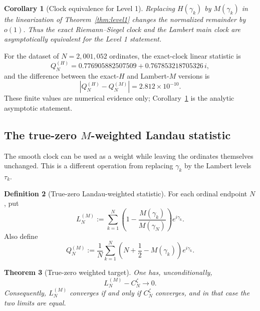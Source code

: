 \documentclass[11pt]{amsart}
\numberwithin{equation}{section}
\newtheorem{theorem}{Theorem}[section]
\newtheorem{corollary}[theorem]{Corollary}
\theoremstyle{definition}
\newtheorem{definition}[theorem]{Definition}
\theoremstyle{remark}
\begin{document}
\begin{corollary}[Clock equivalence for Level 1]\label{cor:clocklevel1}
Replacing $H(\gamma_k)$ by $M(\gamma_k)$ in the linearization of Theorem~\ref{thm:level1} changes the normalized remainder by $o(1)$. Thus the exact Riemann--Siegel clock and the Lambert main clock are asymptotically equivalent for the Level 1 statement.
\end{corollary}

For the dataset of $N=2{,}001{,}052$ ordinates, the exact-clock linear statistic is
\[
Q_N^{(H)}
=0.776905882507509+0.767853218705326\,i,
\]
and the difference between the exact-$H$ and Lambert-$M$ versions is
\[
|Q_N^{(H)}-Q_N^{(M)}|=2.812\times10^{-10}.
\]
These finite values are numerical evidence only; Corollary~\ref{cor:clocklevel1} is the analytic asymptotic statement.

\subsection{The true-zero $M$-weighted Landau statistic}\label{subsec:true_zero_landau}

The smooth clock can be used as a weight while leaving the ordinates themselves unchanged. This is a different operation from replacing $\gamma_k$ by the Lambert levels $\tau_k$.

\begin{definition}[True-zero Landau-weighted statistic]\label{def:true_zero_landau}
For each ordinal endpoint $N$, put
\begin{equation}\label{eq:true_zero_landau}
L_N^{(M)}
:=\sum_{k=1}^{N}
\left(1-\frac{M(\gamma_k)}{M(\gamma_N)}\right)e^{i\gamma_k}.
\end{equation}
Also define
\begin{equation}\label{eq:QM_definition}
Q_N^{(M)}
:=\frac1N\sum_{k=1}^{N}
\left(N+\frac12-M(\gamma_k)\right)e^{i\gamma_k}.
\end{equation}
\end{definition}

\begin{theorem}[True-zero weighted target]\label{thm:truezerolandau}
One has, unconditionally,
\begin{equation}\label{eq:true_zero_landau_equivalence}
L_N^{(M)}-C_N^{\zeta}\longrightarrow0.
\end{equation}
Consequently, $L_N^{(M)}$ converges if and only if $C_N^{\zeta}$ converges, and in that case the two limits are equal.
\end{theorem}
\end{document}
